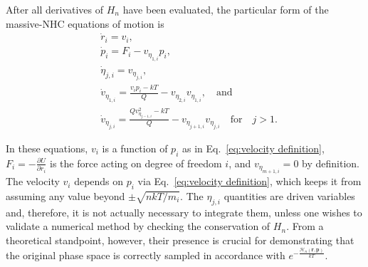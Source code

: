 \documentclass[
aip,
jcp,
reprint,
]{revtex4-1}
\newcommand{\vt}[1]{\boldsymbol{\mathbf{#1}}}          %
\newcommand{\diff}[2]{\frac{\partial #2}{\partial #1}} %
\begin{document}
After all derivatives of $H_n$ have been evaluated, the particular form of the massive-NHC equations of motion is
\begin{subequations}
	\label{eq:NHC equations}
	\begin{align}
	&\dot{r}_i = v_i, \\
	&\dot{p}_i = F_i - v_{\eta_{1,i}} p_i, \label{eq:NHC equations p} \\
	&\dot{\eta}_{j,i} = v_{\eta_{j,i}}, \\
	&\dot{v}_{\eta_{1, i}} = \frac{v_i p_i - kT}{Q} - v_{\eta_{2, i}} v_{\eta_{1, i}}, \quad \mathrm{and}  \label{eq:NHC equations v_eta_1} \\
	&\dot{v}_{\eta_{j, i}} = \frac{Q v_{\eta_{j-1, i}}^2 - kT}{Q} - v_{\eta_{j+1, i}} v_{\eta_{j, i}} \quad \mathrm{for} \quad j > 1.
	\end{align}
\end{subequations}

In these equations, $v_i$ is a function of $p_i$ as in Eq.~\eqref{eq:velocity definition},
$F_i = -\diff{r_i}{U}$ is the force acting on degree of freedom $i$,
and $v_{\eta_{m+1, i}} = 0$ by definition.
The velocity $v_i$ depends on $p_i$ via Eq.~\eqref{eq:velocity definition}, which keeps it from assuming any value beyond $\pm \sqrt{{n kT}/{m_i}}$.
The $\eta_{j, i}$ quantities are driven variables and, therefore, it is not actually necessary to integrate them, unless one wishes to validate a numerical method by checking the conservation of $H_n$.
From a theoretical standpoint, however, their presence is crucial for demonstrating that the original phase space is correctly sampled in accordance with $e^{-\frac{\mathcal{H}_n(\vt r, \vt p)}{kT}}$.
\end{document}
